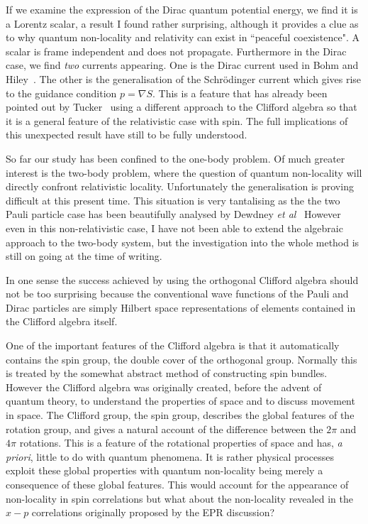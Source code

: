 \documentclass[11pt]{article}
\begin{document}
If we examine the expression of the Dirac quantum potential energy, we find it is a Lorentz scalar, a result I found rather surprising, although it provides a clue as to why quantum non-locality and relativity can exist in ``peaceful coexistence".  A scalar is frame independent and does not propagate. Furthermore in the Dirac case, we find  {\em two} currents appearing.  One is the Dirac current used in Bohm and Hiley~\cite{dbbh93}.  The other is the generalisation of the Schr\"{o}dinger current which gives rise to the guidance condition $p=\nabla S$.  This is a feature that has already been pointed out by Tucker~\cite{rt88} using a different approach to the Clifford algebra so that it is a general feature of the relativistic case with spin.
 The full implications of this unexpected result have still to be fully understood. 
 
 So far our study has been confined to the one-body problem.  Of much greater interest is the two-body problem, where the question of quantum non-locality will directly confront relativistic locality. Unfortunately the generalisation  is proving difficult at this present time.  This situation is very tantalising as the  the two Pauli particle case has been beautifully analysed by Dewdney {\em et al}~\cite{cdphak88}
However even in this non-relativistic case, I have not been able to extend the algebraic approach to the two-body system, but the investigation into the whole method is still on going at the time of writing.

In one sense the success achieved by using the orthogonal Clifford algebra should not be too surprising because the conventional wave functions of the Pauli and Dirac particles are simply Hilbert space representations of elements contained in the Clifford algebra itself.  


One of the important features of the Clifford algebra is that it automatically contains the spin group, the double cover of the orthogonal group.  Normally this is treated by the somewhat abstract method of constructing spin bundles.  However the Clifford algebra was originally created, before the advent of quantum theory, to understand the properties of space and to discuss movement in space.  The Clifford group, the spin group, describes the global features of the rotation group, and gives a natural account of the difference between the $2\pi$ and $4\pi$ rotations.  This is a feature of the rotational properties of space and has, {\em a priori}, little to do with quantum phenomena.  It is rather physical processes exploit these global properties with quantum non-locality being merely a consequence of these global features.  This would account for the appearance of non-locality in spin correlations but what about the non-locality revealed in the $x-p$ correlations originally proposed by the EPR discussion?
\end{document}
